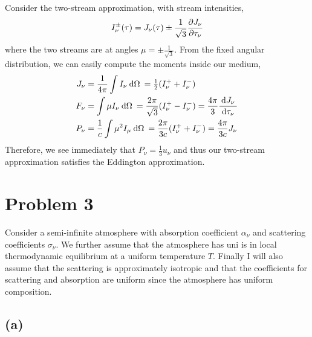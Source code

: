 \documentclass[12pt]{article}
\begin{document}
Consider the two-stream approximation, with stream intensities,
\[ I_\nu^{\pm}(\tau) = J_\nu(\tau) \pm \frac{1}{\sqrt{3}} \frac{\partial{J_\nu}}{\partial{\tau_\nu}} \]
where the two streams are at angles $\mu = \pm \frac{1}{\sqrt{3}}$. From the fixed angular distribution, we can easily compute the moments inside our medium,
\begin{align*}
J_\nu &= \frac{1}{4 \pi} \int I_\nu \: \mathrm{d}\Omega \: = \tfrac{1}{2} (I_\nu^+ + I_\nu^-)
\\
F_\nu & = \int \mu I_\nu \: \mathrm{d}\Omega \:= \frac{2 \pi}{\sqrt{3}} (I_\nu^+ - I_\nu^-) = \frac{4 \pi}{3} \frac{\: \mathrm{d}J_\nu \:}{\: \mathrm{d}\tau_\nu \:} 
\\
P_\nu & = \frac{1}{c} \int \mu^2 I_\mu \: \mathrm{d}\Omega \: = \frac{2 \pi}{3c} (I_\nu^+ + I_\nu^-) = \frac{4 \pi}{3c} J_\nu
\end{align*} 
Therefore, we see immediately that $P_\nu = \frac{1}{3} u_\nu$ and thus our two-stream approximation satisfies the Eddington approximation. 

\section{Problem 3}

Consider a semi-infinite atmosphere with absorption coefficient $\alpha_\nu$ and scattering coefficients $\sigma_\nu$. We further assume that the atmosphere has uni is in local thermodynamic equilibrium at a uniform temperature $T$. Finally I will also assume that the scattering is approximately isotropic and that the coefficients for scattering and absorption are uniform since the atmosphere has uniform composition.

\subsection*{(a)}
\end{document}
